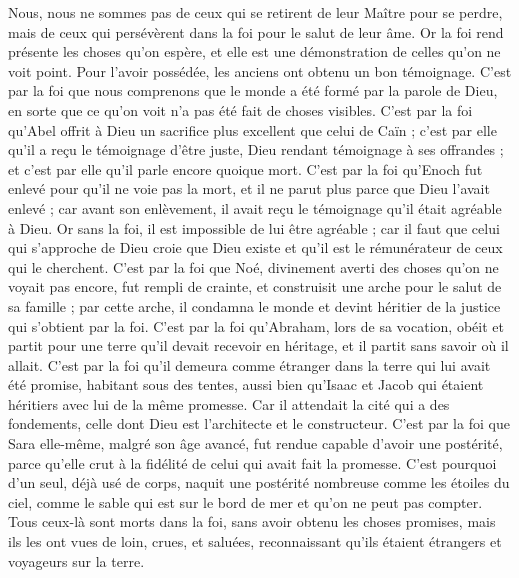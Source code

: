 \begin{multicols}{2}
Nous, nous ne sommes pas de ceux qui se retirent de leur Maître pour se perdre, mais de ceux qui persévèrent dans la foi pour le salut de leur âme.
\VerseOne{}Or la foi rend présente les choses qu'on espère, et elle est une démonstration de celles qu'on ne voit point.
Pour l’avoir possédée, les anciens ont obtenu un bon témoignage.
C’est par la foi que nous comprenons que le monde a été formé par la parole de Dieu, en sorte que ce qu’on voit n’a pas été fait de choses visibles.
\TextTitle{[Abel]}
C’est par la foi qu’Abel offrit à Dieu un sacrifice plus excellent que celui de Caïn ; c’est par elle qu’il a reçu le témoignage d’être juste, Dieu rendant témoignage à ses offrandes ; et c’est par elle qu’il parle encore quoique mort.
\TextTitle{[Hénoc]}
C’est par la foi qu’Enoch fut enlevé pour qu’il ne voie pas la mort, et il ne parut plus parce que Dieu l’avait enlevé ; car avant son enlèvement, il avait reçu le témoignage qu’il était agréable à Dieu.
Or sans la foi, il est impossible de lui être agréable ; car il faut que celui qui s’approche de Dieu croie que Dieu existe et qu'il est le rémunérateur de ceux qui le cherchent.
\TextTitle{[Noé]}
C’est par la foi que Noé, divinement averti des choses qu’on ne voyait pas encore, fut rempli de crainte, et construisit une arche pour le salut de sa famille ; par cette arche, il condamna le monde et devint héritier de la justice qui s’obtient par la foi.
C’est par la foi qu’Abraham, lors de sa vocation, obéit et partit pour une terre qu'il devait recevoir en héritage, et il partit sans savoir où il allait.
C’est par la foi qu’il demeura comme étranger dans la terre qui lui avait été promise, habitant sous des tentes, aussi bien qu’Isaac et Jacob qui étaient héritiers avec lui de la même promesse.
Car il attendait la cité qui a des fondements, celle dont Dieu est l'architecte et le constructeur.
C’est par la foi que Sara elle-même, malgré son âge avancé, fut rendue capable d’avoir une postérité, parce qu’elle crut à la fidélité de celui qui avait fait la promesse.
C'est pourquoi d'un seul, déjà usé de corps, naquit une postérité nombreuse comme les étoiles du ciel, comme le sable qui est sur le bord de mer et qu’on ne peut pas compter.
Tous ceux-là sont morts dans la foi, sans avoir obtenu les choses promises, mais ils les ont vues de loin, crues, et saluées, reconnaissant qu'ils étaient étrangers et voyageurs sur la terre.

\end{multicols}

